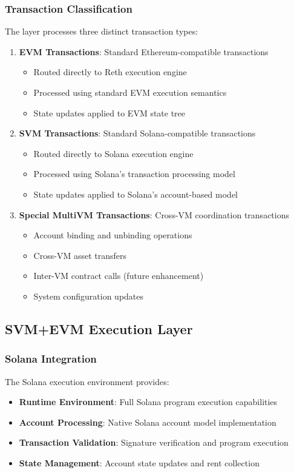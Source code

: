 \documentclass[11pt,a4paper]{article}
\begin{document}
\subsubsection{Transaction Classification}
The layer processes three distinct transaction types:

\begin{enumerate}
    \item \textbf{EVM Transactions}: Standard Ethereum-compatible transactions
    \begin{itemize}
        \item Routed directly to Reth execution engine
        \item Processed using standard EVM execution semantics
        \item State updates applied to EVM state tree
    \end{itemize}
    
    \item \textbf{SVM Transactions}: Standard Solana-compatible transactions
    \begin{itemize}
        \item Routed directly to Solana execution engine
        \item Processed using Solana's transaction processing model
        \item State updates applied to Solana's account-based model
    \end{itemize}
    
    \item \textbf{Special MultiVM Transactions}: Cross-VM coordination transactions
    \begin{itemize}
        \item Account binding and unbinding operations
        \item Cross-VM asset transfers
        \item Inter-VM contract calls (future enhancement)
        \item System configuration updates
    \end{itemize}
\end{enumerate}

\subsection{SVM+EVM Execution Layer}

\subsubsection{Solana Integration}
The Solana execution environment provides:
\begin{itemize}
    \item \textbf{Runtime Environment}: Full Solana program execution capabilities
    \item \textbf{Account Processing}: Native Solana account model implementation
    \item \textbf{Transaction Validation}: Signature verification and program execution
    \item \textbf{State Management}: Account state updates and rent collection
\end{itemize}
\end{document}
